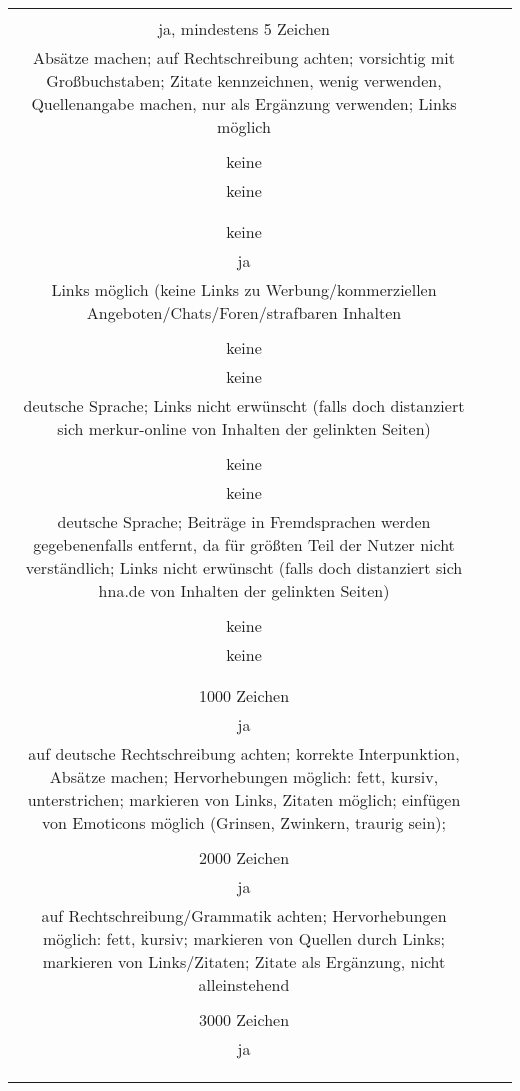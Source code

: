 \begin{landscape}
\begin{tabular}{ccc}
{		1500 Zeichen\\
		ja, mindestens 5 Zeichen\\
		Absätze machen; auf Rechtschreibung achten; vorsichtig mit Großbuchstaben; Zitate kennzeichnen, wenig verwenden, Quellenangabe machen, nur als Ergänzung verwenden; Links möglich \\
		&
		\\
		keine\\
		keine\\
		\\
		&%
		\\
		keine\\
		ja\\
		Links möglich (keine Links zu Werbung/kommerziellen Angeboten/Chats/Foren/strafbaren Inhalten\\
		&%
		\\
		keine\\
		keine\\
		deutsche Sprache; Links nicht erwünscht (falls doch distanziert sich merkur-online von Inhalten der gelinkten Seiten)\\
		&
		\\
		keine\\
		keine\\
		deutsche Sprache; Beiträge in Fremdsprachen werden gegebenenfalls entfernt, da für größten Teil der Nutzer nicht verständlich; Links nicht erwünscht (falls doch distanziert sich hna.de von Inhalten der gelinkten Seiten)\\
		&
		\\
		keine\\
		keine\\
		\\
		&
		\\
		1000 Zeichen\\
		ja\\
		auf deutsche Rechtschreibung achten; korrekte Interpunktion, Absätze machen; Hervorhebungen möglich: fett, kursiv, unterstrichen; markieren von Links, Zitaten möglich; einfügen von Emoticons möglich (Grinsen, Zwinkern, traurig sein); \\
		&%
		\\
		2000 Zeichen\\
		ja\\
		auf Rechtschreibung/Grammatik achten; Hervorhebungen möglich: fett, kursiv; markieren von Quellen durch Links; markieren von Links/Zitaten; Zitate als Ergänzung, nicht alleinstehend\\
		&
		\\
		3000 Zeichen\\
		ja\\
		\\
		&
		\\ \hline
		
}
\end{tabular}
\end{landscape}
